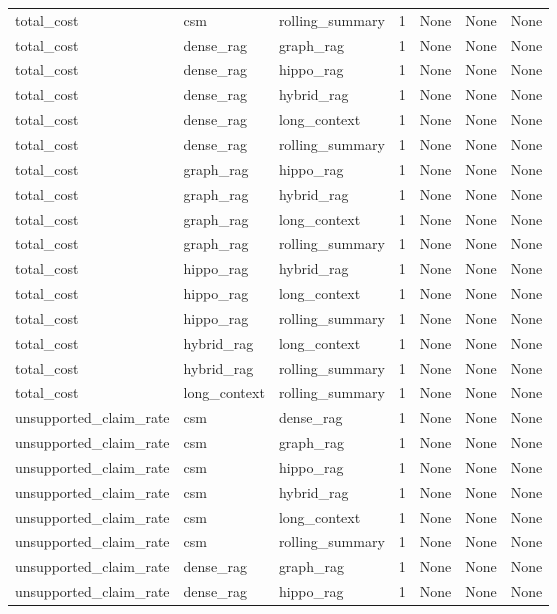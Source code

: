 \begin{tabular}{lllllll}
total\_cost & csm & rolling\_summary & 1 & None & None & None \\
total\_cost & dense\_rag & graph\_rag & 1 & None & None & None \\
total\_cost & dense\_rag & hippo\_rag & 1 & None & None & None \\
total\_cost & dense\_rag & hybrid\_rag & 1 & None & None & None \\
total\_cost & dense\_rag & long\_context & 1 & None & None & None \\
total\_cost & dense\_rag & rolling\_summary & 1 & None & None & None \\
total\_cost & graph\_rag & hippo\_rag & 1 & None & None & None \\
total\_cost & graph\_rag & hybrid\_rag & 1 & None & None & None \\
total\_cost & graph\_rag & long\_context & 1 & None & None & None \\
total\_cost & graph\_rag & rolling\_summary & 1 & None & None & None \\
total\_cost & hippo\_rag & hybrid\_rag & 1 & None & None & None \\
total\_cost & hippo\_rag & long\_context & 1 & None & None & None \\
total\_cost & hippo\_rag & rolling\_summary & 1 & None & None & None \\
total\_cost & hybrid\_rag & long\_context & 1 & None & None & None \\
total\_cost & hybrid\_rag & rolling\_summary & 1 & None & None & None \\
total\_cost & long\_context & rolling\_summary & 1 & None & None & None \\
unsupported\_claim\_rate & csm & dense\_rag & 1 & None & None & None \\
unsupported\_claim\_rate & csm & graph\_rag & 1 & None & None & None \\
unsupported\_claim\_rate & csm & hippo\_rag & 1 & None & None & None \\
unsupported\_claim\_rate & csm & hybrid\_rag & 1 & None & None & None \\
unsupported\_claim\_rate & csm & long\_context & 1 & None & None & None \\
unsupported\_claim\_rate & csm & rolling\_summary & 1 & None & None & None \\
unsupported\_claim\_rate & dense\_rag & graph\_rag & 1 & None & None & None \\
unsupported\_claim\_rate & dense\_rag & hippo\_rag & 1 & None & None & None \\

\end{tabular}
